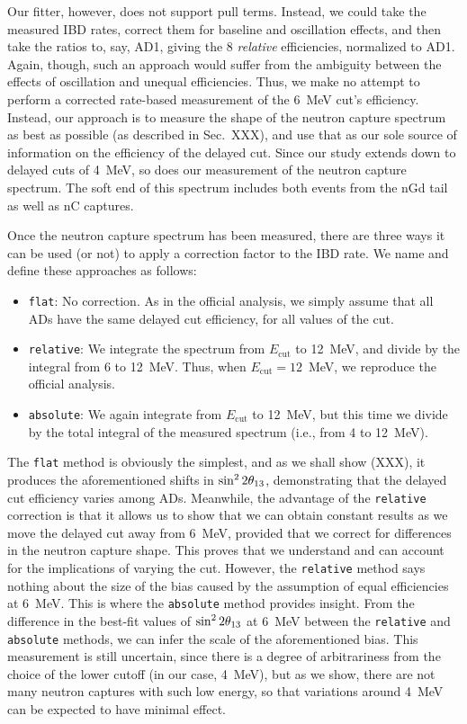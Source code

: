 \documentclass[../thesis.tex]{subfiles}
\begin{document}
Our fitter, however, does not support pull terms. Instead, we could take the measured IBD rates, correct them for baseline and oscillation effects, and then take the ratios to, say, AD1, giving the 8 \emph{relative} efficiencies, normalized to AD1. Again, though, such an approach would suffer from the ambiguity between the effects of oscillation and unequal efficiencies. Thus, we make no attempt to perform a corrected rate-based measurement of the 6~MeV cut's efficiency. Instead, our approach is to measure the shape of the neutron capture spectrum as best as possible (as described in Sec.~XXX), and use that as our sole source of information on the efficiency of the delayed cut. Since our study extends down to delayed cuts of 4~MeV, so does our measurement of the neutron capture spectrum. The soft end of this spectrum includes both events from the nGd tail as well as nC captures.

Once the neutron capture spectrum has been measured, there are three ways it can be used (or not) to apply a correction factor to the IBD rate. We name and define these approaches as follows:

\begin{itemize}
\item \texttt{flat}: No correction. As in the official analysis, we simply assume that all ADs have the same delayed cut efficiency, for all values of the cut.
\item \texttt{relative}: We integrate the spectrum from $E_{\mathrm{cut}}$ to 12~MeV, and divide by the integral from 6 to 12~MeV. Thus, when $E_{\mathrm{cut}} = 12$~MeV, we reproduce the official analysis.
\item \texttt{absolute}: We again integrate from $E_{\mathrm{cut}}$ to 12~MeV, but this time we divide by the total integral of the measured spectrum (i.e., from 4 to 12~MeV).
\end{itemize}

The \texttt{flat} method is obviously the simplest, and as we shall show (XXX), it produces the aforementioned shifts in $\sin^2 2\theta_{13}$, demonstrating that the delayed cut efficiency varies among ADs. Meanwhile, the advantage of the \texttt{relative} correction is that it allows us to show that we can obtain constant results as we move the delayed cut away from 6~MeV, provided that we correct for differences in the neutron capture shape. This proves that we understand and can account for the implications of varying the cut. However, the \texttt{relative} method says nothing about the size of the bias caused by the assumption of equal efficiencies at 6~MeV. This is where the \texttt{absolute} method provides insight. From the difference in the best-fit values of $\sin^2 2\theta_{13}$ at 6~MeV between the \texttt{relative} and \texttt{absolute} methods, we can infer the scale of the aforementioned bias. This measurement is still uncertain, since there is a degree of arbitrariness from the choice of the lower cutoff (in our case, 4~MeV), but as we show, there are not many neutron captures with such low energy, so that variations around 4~MeV can be expected to have minimal effect.
\end{document}
